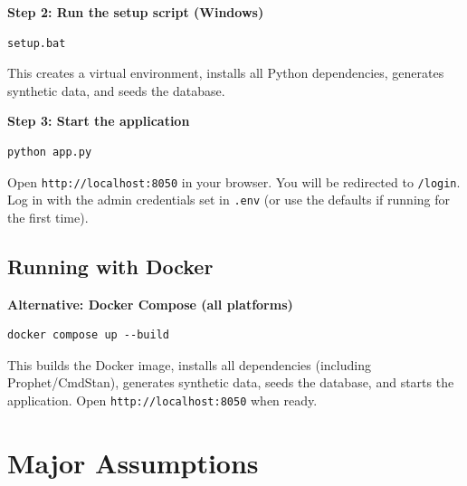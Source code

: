 \documentclass[11pt, a4paper]{article}
\begin{document}
\textbf{Step 2: Run the setup script (Windows)}
\begin{verbatim}
setup.bat
\end{verbatim}
This creates a virtual environment, installs all Python dependencies, generates synthetic data, and seeds the database.

\textbf{Step 3: Start the application}
\begin{verbatim}
python app.py
\end{verbatim}
Open \texttt{http://localhost:8050} in your browser. You will be redirected to \texttt{/login}. Log in with the admin credentials set in \texttt{.env} (or use the defaults if running for the first time).

\vspace{1em}
\subsection{Running with Docker}

\textbf{Alternative: Docker Compose (all platforms)}
\begin{verbatim}
docker compose up --build
\end{verbatim}
This builds the Docker image, installs all dependencies (including Prophet/CmdStan), generates synthetic data, seeds the database, and starts the application. Open \texttt{http://localhost:8050} when ready.


\section{Major Assumptions}
\end{document}
